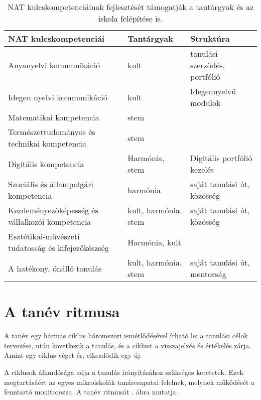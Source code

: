 \begin{table}
  \centering
      \begin{tabular}{p{5cm}|>{\raggedright}p{3cm}|p{3cm}}


        \textbf{NAT kulcskompetenciái} & \textbf{Tantárgyak} & \textbf{Struktúra}\\ \hline
Anyanyelvi kommunikáció & kult & tanulási szerződés, portfólió\\ \hline
Idegen nyelvi kommunikáció & kult & Idegennyelvű modulok\\ \hline
Matematikai kompetencia & stem & \\ \hline
Természettudományos és technikai kompetencia & stem & \\ \hline
Digitális kompetencia & Harmónia, stem & Digitális portfólió kezelés\\ \hline
Szociális és állampolgári kompetencia & harmónia & saját tanulási út, közösség\\ \hline
Kezdeményezőképesség és vállalkozói kompetencia & kult, harmónia, stem & saját tanulási út, közösség\\ \hline
Esztétikai-művészeti tudatosság és kifejezőkészség & Harmónia, kult & \\ \hline
A hatékony, önálló tanulás & kult, harmónia, stem & saját tanulási út, mentorság\\

      \end{tabular}
      \caption{NAT kulcskompetenciáinak fejlesztését támogatják a tantárgyak és az iskola felépítése is.}
      \label{tbl:nat_kulcs}
    \end{table}

\section{A tanév ritmusa}

A tanév egy hármas ciklus háromszori ismétlődésével írható le: a tanulási célok tervezése, után következik a tanulás, és a ciklust a visszajelzés és értékelés zárja.  Amint egy ciklus véget ér, elkezdődik egy új.

A ciklusok állandósága adja a tanulás irányításához szükséges keretetek. Ezek megtartásáért az egyes mikroiskolák tanárcsapatai felelnek, melynek működését a fenntartó monitorozza. A tanév ritmusát . ábra mutatja.




